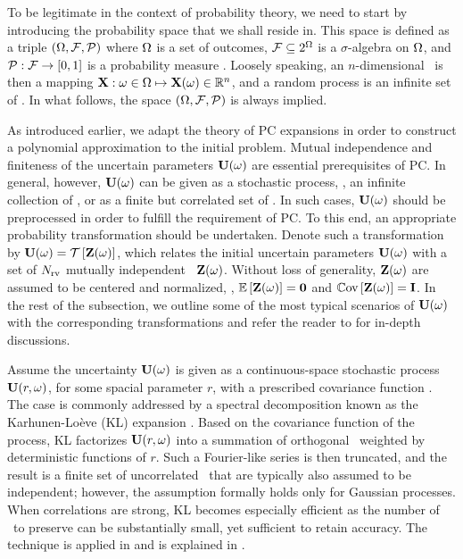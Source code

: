 To be legitimate in the context of probability theory, we need to start by introducing the probability space that we shall reside in. This space is defined as a triple $(\Omega, \mathcal{F}, \mathcal{P})$ where $\Omega$ is a set of outcomes, $\mathcal{F} \subseteq 2^\Omega$ is a $\sigma$-algebra on $\Omega$, and $\mathcal{P}: \mathcal{F} \to [0, 1]$ is a probability measure \cite{durrett2010}. Loosely speaking, an $n$-dimensional \rv\ is then a mapping $\mathbf{X}: \omega \in \Omega \mapsto \mathbf{X}(\omega) \in \mathbb{R}^n$, and a random process is an infinite set of \rvs. In what follows, the space $(\Omega, \mathcal{F}, \mathcal{P})$ is always implied.

As introduced earlier, we adapt the theory of PC expansions in order to construct a polynomial approximation to the initial problem. Mutual independence and finiteness of the uncertain parameters $\mathbf{U}(\omega)$ are essential prerequisites of PC. In general, however, $\mathbf{U}(\omega)$ can be given as a stochastic process, \ie, an infinite collection of \rvs, or as a finite but correlated set of \rvs. In such cases, $\mathbf{U}(\omega)$ should be preprocessed in order to fulfill the requirement of PC. To this end, an appropriate probability transformation should be undertaken. Denote such a transformation by $\mathbf{U}(\omega) = \mathcal{T}\left[\mathbf{Z}(\omega)\right]$, which relates the initial uncertain parameters $\mathbf{U}(\omega)$ with a set of ${N_\text{rv}}$ mutually independent \rvs\ $\mathbf{Z}(\omega)$. Without loss of generality, $\mathbf{Z}(\omega)$ are assumed to be centered and normalized, \ie, $\oExp{\vZ(\o)} = \mZero$ and $\oCov{\vZ(\o)} = \mI$. In the rest of the subsection, we outline some of the most typical scenarios of $\mathbf{U}(\omega)$ with the corresponding transformations and refer the reader to \cite{xiu2010, eldred2009} for in-depth discussions.

Assume the uncertainty $\mathbf{U}(\omega)$ is given as a continuous-space stochastic process $\mathbf{U}(r, \omega)$, for some spacial parameter $r$, with a prescribed covariance function \cite{durrett2010}. The case is commonly addressed by a spectral decomposition known as the Karhunen-Lo\`{e}ve (KL) expansion \cite{xiu2010, maitre2010, ghanem1991}. Based on the covariance function of the process, KL factorizes $\mathbf{U}(r, \omega)$ into a summation of orthogonal \rvs\ weighted by deterministic functions of $r$. Such a Fourier-like series is then truncated, and the result is a finite set of uncorrelated \rvs\ that are typically also assumed to be independent; however, the assumption formally holds only for Gaussian processes. When correlations are strong, KL becomes especially efficient as the number of \rvs\ to preserve can be substantially small, yet sufficient to retain accuracy. The technique is applied in  and is explained in .

